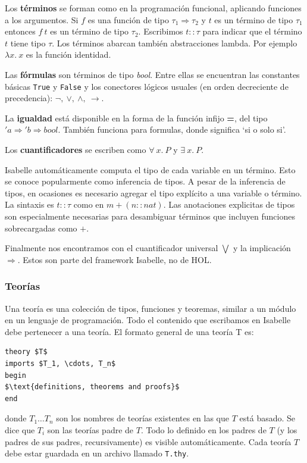 \documentclass[12pt]{book}
\begin{document}
Los \textbf{términos} se forman como en la programación funcional, aplicando funciones a los argumentos. Si $f$ es una función de tipo $\tau_1 \Rightarrow \tau_2$ y $t$ es un término de tipo $\tau_1$ entonces $f\ t$ es un término de tipo $\tau_2$. Escribimos $t :: \tau$ para indicar que el término $t$ tiene tipo $\tau$. Los términos abarcan también abstracciones lambda. Por ejemplo $\lambda x.\ x$ es la función identidad.

Las \textbf{fórmulas} son términos de tipo \textit{bool}. Entre ellas se encuentran las constantes básicas \texttt{True} y \texttt{False} y los conectores lógicos usuales (en orden decreciente de precedencia): $\neg,\ \vee,\ \wedge,\ \rightarrow$.

La \textbf{igualdad} está disponible en la forma de la función infijo \textbf{=}, del tipo $'a \Rightarrow 'b \Rightarrow  bool$. También funciona para formulas, donde significa `si o solo si'.

Los \textbf{cuantificadores} se escriben como $\forall\ x.\ P$ y $\exists\ x.\ P$.

Isabelle automáticamente computa el tipo de cada variable en un término. Esto se conoce popularmente como inferencia de tipos. A pesar de la inferencia de tipos, en ocasiones es necesario agregar el tipo explícito a una variable o término. La sintaxis es $t :: \tau$ como en $m + (n::nat)$. Las anotaciones explicitas de tipos son especialmente necesarias para desambiguar términos que incluyen funciones sobrecargadas como $+$.

Finalmente nos encontramos con el cuantificador universal $\bigvee$ y la implicación $\Longrightarrow$. Estos son parte del framework Isabelle, no de HOL.\@

\subsubsection{Teorías}

Una teoría es una colección de tipos, funciones y teoremas, similar a un módulo en un lenguaje de programación. Todo el contenido que escribamos en Isabelle debe pertenecer a una teoría. El formato general de una teoría T es:

\begin{lstlisting}[style=Isabelle]
theory $T$
imports $T_1, \cdots, T_n$
begin
$\text{definitions, theorems and proofs}$
end
\end{lstlisting}

donde $T_1 \ldots T_n$ son los nombres de teorías existentes en las que $T$ está basado. Se dice que $T_i$ son las teorías padre de $T$. Todo lo definido en los padres de $T$ (y los padres de sus padres, recursivamente) es visible automáticamente. Cada teoría $T$ debe estar guardada en un archivo llamado \texttt{T.thy}.
\end{document}
